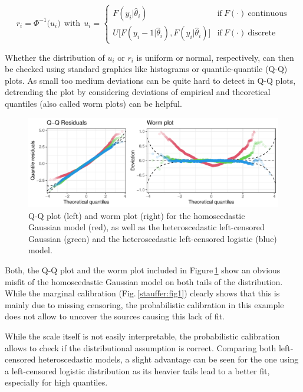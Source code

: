 \documentclass[twoside]{report}
\begin{document}
$$
r_i = \Phi^{-1}\big(u_i)~~\text{with}~~u_i = \begin{cases}
    F(y_i | \hat{\theta}_i) & \text{if}~F(\cdot)~\text{continuous}  \\
    U\big[F(y_i - 1 | \hat{\theta}_i), F(y_i | \hat{\theta}_i)\big] & \text{if}~F(\cdot)~\text{discrete}
\end{cases}
$$

Whether the distribution of $u_i$ or $r_i$ is uniform or normal, respectively,
can then be checked using standard graphics like histograms or quantile-quantile
(Q-Q) plots. As small too medium deviations can be quite hard
to detect in Q-Q plots, detrending the plot by considering deviations of empirical
and theoretical quantiles (also called worm plots) can be helpful.

\begin{figure}[!ht]\centering
    \includegraphics[width=\textwidth]{Stauffer-qqresiduals}
    \caption{\label{stauffer:fig2} 
        Q-Q plot (left) and worm plot (right) for the homoscedastic
        Gaussian model (red), as well as the heteroscedastic left-censored
        Gaussian (green) and the heteroscedastic left-censored logistic (blue) model.
    }
\end{figure}

Both, the Q-Q plot and the worm plot included in Figure\,\ref{stauffer:fig2}
show an obvious misfit of the homoscedastic Gaussian model on both tails of the
distribution. While the marginal calibration (Fig.\,\ref{stauffer:fig1})
clearly shows that this is mainly due to missing censoring, the probabilistic
calibration in this example does not allow to uncover the sources causing this
lack of fit.

While the scale itself is not easily interpretable, the probabilistic calibration
allows to check if the distributional assumption is correct.  Comparing both
left-censored heteroscedastic models, a slight advantage can be seen for the
one using a left-censored logistic distribution as its heavier tails lead to a
better fit, especially for high quantiles.
\end{document}
